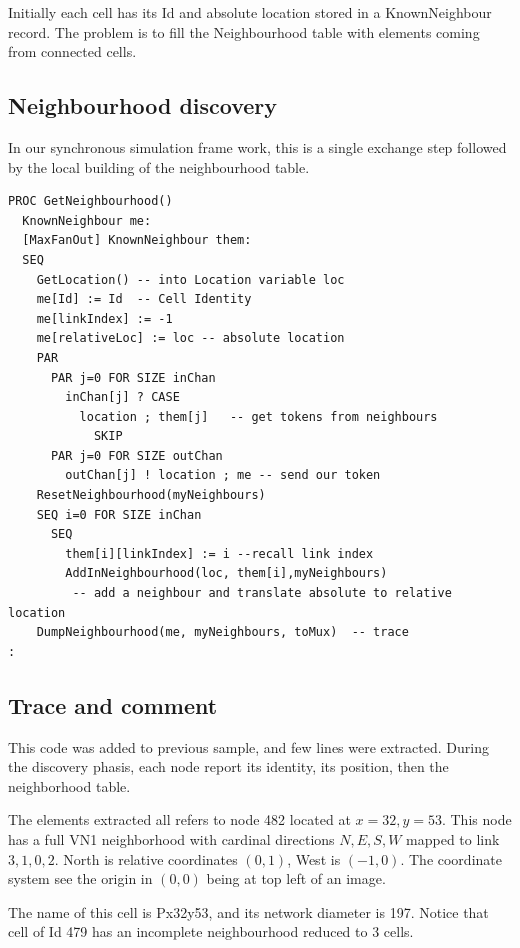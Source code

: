 Initially each cell has its Id and absolute location stored in a KnownNeighbour
record. The problem is to fill the Neighbourhood table with elements coming
from connected cells.



 \subsection {Neighbourhood   discovery }

In our synchronous simulation frame work, this is a single exchange step
followed by the local building of the neighbourhood table.


\begin{lstlisting}
PROC GetNeighbourhood()
  KnownNeighbour me:
  [MaxFanOut] KnownNeighbour them: 
  SEQ
    GetLocation() -- into Location variable loc
    me[Id] := Id  -- Cell Identity
    me[linkIndex] := -1 
    me[relativeLoc] := loc -- absolute location
    PAR
      PAR j=0 FOR SIZE inChan
        inChan[j] ? CASE
          location ; them[j]   -- get tokens from neighbours
            SKIP 
      PAR j=0 FOR SIZE outChan
        outChan[j] ! location ; me -- send our token
    ResetNeighbourhood(myNeighbours)
    SEQ i=0 FOR SIZE inChan
      SEQ
        them[i][linkIndex] := i --recall link index
        AddInNeighbourhood(loc, them[i],myNeighbours)
         -- add a neighbour and translate absolute to relative location
    DumpNeighbourhood(me, myNeighbours, toMux)  -- trace
:
\end{lstlisting}

\subsection {Trace and comment }

This code was added to previous sample, and few lines were extracted.
During the discovery phasis, each node report its identity, its position, then 
the neighborhood table.

The elements extracted all refers to node 482  located at $x= 32, y=53$.
This node has a full VN1 neighborhood with cardinal directions $ N, E, S,  W$
mapped to link $ 3 , 1, 0, 2$. North is relative coordinates $(0,1)$, West is $(-1, 0)$.
The coordinate system see the origin in $(0,0)$ being at top left of an image.

The name of this cell is Px32y53, and its network diameter is 197.
Notice that cell of Id 479 has an incomplete neighbourhood reduced to 3 cells.

